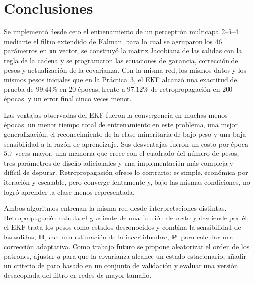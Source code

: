\documentclass[conference]{IEEEtran}
\begin{document}
\section{Conclusiones}
Se implementó desde cero el entrenamiento de un perceptrón multicapa
2--6--4 mediante el filtro extendido de Kalman, para lo cual se agruparon
los $46$ parámetros en un vector, se construyó la matriz Jacobiana de las
salidas con la regla de la cadena y se programaron las ecuaciones de
ganancia, corrección de pesos y actualización de la covarianza. Con la
misma red, los mismos datos y los mismos pesos iniciales que en la
Práctica~3, el EKF alcanzó una exactitud de prueba de $99.44\%$ en $20$
épocas, frente a $97.12\%$ de retropropagación en $200$ épocas, y un error
final cinco veces menor.

Las ventajas observadas del EKF fueron la convergencia en muchas menos
épocas, un menor tiempo total de entrenamiento en este problema, una mejor
generalización, el reconocimiento de la clase minoritaria de bajo peso y
una baja sensibilidad a la razón de aprendizaje. Sus desventajas fueron un
costo por época $5.7$ veces mayor, una memoria que crece con el cuadrado
del número de pesos, tres parámetros de diseño adicionales y una
implementación más compleja y difícil de depurar. Retropropagación ofrece
lo contrario: es simple, económica por iteración y escalable, pero converge
lentamente y, bajo las mismas condiciones, no logró aprender la clase menos
representada.

Ambos algoritmos entrenan la misma red desde interpretaciones distintas.
Retropropagación calcula el gradiente de una función de costo y desciende
por él; el EKF trata los pesos como estados desconocidos y combina la
sensibilidad de las salidas, $\mathbf{H}$, con una estimación de la
incertidumbre, $\mathbf{P}$, para calcular una corrección adaptativa. Como
trabajo futuro se propone aleatorizar el orden de los patrones, ajustar
$q$ para que la covarianza alcance un estado estacionario, añadir un
criterio de paro basado en un conjunto de validación y evaluar una versión
desacoplada del filtro en redes de mayor tamaño.
\end{document}
